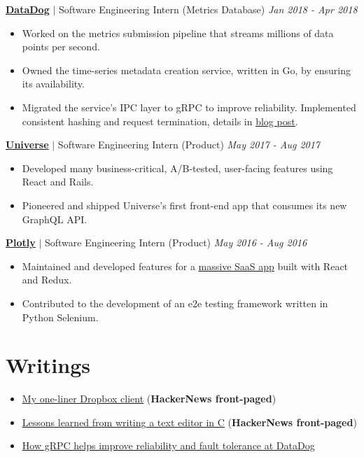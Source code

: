 \documentclass[paper=a4,fontsize=15pt]{scrartcl}
\newcommand{\bighalfspace}{\vspace*{0.75em}}
\begin{document}
\bighalfspace
\normalsize
\noindent \href{https://datadoghq.com}{\textbf{\ul{DataDog}}}
$\vert$ \small Software Engineering Intern (Metrics Database)
{\hfill \footnotesize \textit{Jan 2018 - Apr 2018}}
\begin{itemize}[noitemsep,leftmargin=20pt,label=\raisebox{0.25ex}{\tiny$\bullet$},topsep=5pt]
  \small
  \item Worked on the metrics submission pipeline that streams millions of data
    points per second.
  \item Owned the time-series metadata creation service, written in Go, by
    ensuring its availability.
  \item Migrated the service's IPC layer to gRPC to improve reliability.
    Implemented consistent hashing and request termination, details in
    \href{http://lpan.io/migrating-to-grpc}{\ul{blog post}}.
\end{itemize}

\bighalfspace
\normalsize
\noindent \href{https://universe.com}{\ul{\textbf{Universe}}}
$\vert$ \small Software Engineering Intern (Product)
{\hfill \footnotesize \textit{May 2017 - Aug 2017}}
\begin{itemize}[noitemsep,leftmargin=20pt,label=\raisebox{0.25ex}{\tiny$\bullet$},topsep=5pt]
  \small
  \item Developed many business-critical, A/B-tested, user-facing features
    using React and Rails.
  \item Pioneered and shipped Universe's first front-end app that consumes its
    new GraphQL API.
\end{itemize}

\bighalfspace
\normalsize
\noindent \href{https://plot.ly}{\textbf{\ul{Plotly}}}
$\vert$ \small Software Engineering Intern (Product)
{\hfill \footnotesize \textit{May 2016 - Aug 2016}}
\begin{itemize}[noitemsep,leftmargin=20pt,label=\raisebox{0.25ex}{\tiny$\bullet$},topsep=5pt]
  \small
  \item Maintained and developed features for a
    \href{https://plot.ly/online-chart-maker/}{\ul{massive SaaS app}} built with
    React and Redux.
  \item Contributed to the development of an e2e testing framework written in
    Python Selenium.
\end{itemize}

\section*{Writings}{}
\begin{itemize}[noitemsep,leftmargin=20pt,label=\raisebox{0.25ex}{\tiny$\bullet$},topsep=5pt]
  \small
  \item \href{http://lpan.io/one-liner-dropbox-client}{\ul{My one-liner Dropbox
        client}} (\textbf{HackerNews front-paged})
  \item \href{http://lpan.io/what-i-learnt-from-viw}{\ul{Lessons learned from
        writing a text editor in C}} (\textbf{HackerNews front-paged})
  \item \href{http://lpan.io/migrating-to-grpc}{\ul{How gRPC helps improve
        reliability and fault tolerance at DataDog}}
\end{itemize}
\end{document}
